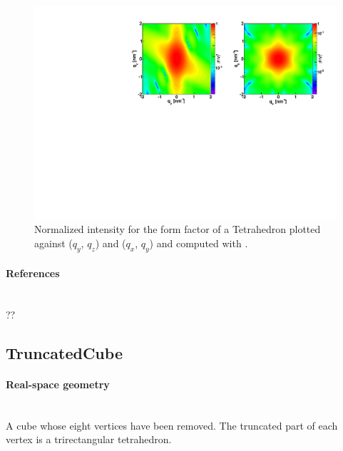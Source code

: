 \begin{figure}[h]
\begin{center}
\includegraphics[angle=-90,width=\textwidth]{fig/ff/figfftetrahedron.pdf}
\end{center}
\caption{Normalized intensity for the form factor of a Tetrahedron
  plotted against ($q_y$, $q_z$) and  ($q_x$, $q_y$) and
  computed with .}
\label{fig:FFtetrahEx}
\end{figure}

\paragraph{References}\strut\\
??

\clearpage
\subsection{TruncatedCube} \label{sec:TruncatedCube}  

\paragraph{Real-space geometry}\strut\\
A cube whose eight vertices have been removed. The truncated part of each vertex is a trirectangular tetrahedron.

